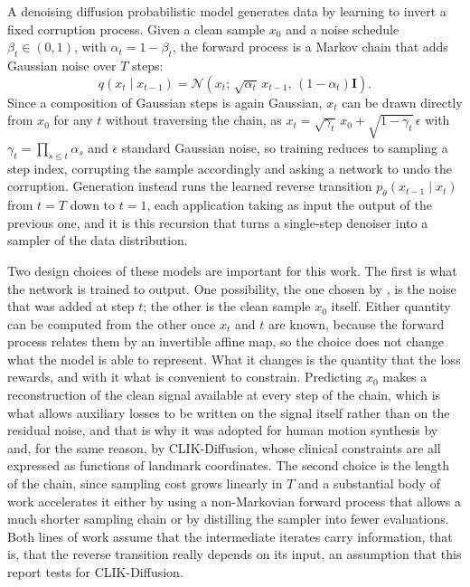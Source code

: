 \documentclass[10pt,a4paper]{article}
\begin{document}
A denoising diffusion probabilistic model \citep{sohldickstein2015,ho2020ddpm} generates data by learning to invert a fixed corruption process. Given a clean sample $x_0$ and a noise schedule $\beta_t \in (0,1)$, with $\alpha_t = 1-\beta_t$, the forward process is a Markov chain that adds Gaussian noise over $T$ steps:
\begin{equation}
q(x_t \mid x_{t-1}) = \mathcal{N}\!\left(x_t;\, \sqrt{\alpha_t}\, x_{t-1},\, (1-\alpha_t)\mathbf{I}\right).
\end{equation}
Since a composition of Gaussian steps is again Gaussian, $x_t$ can be drawn directly from $x_0$ for any $t$ without traversing the chain, as $x_t = \sqrt{\gamma_t}\,x_0 + \sqrt{1-\gamma_t}\,\epsilon$ with $\gamma_t = \prod_{s \le t} \alpha_s$ and $\epsilon$ standard Gaussian noise, so training reduces to sampling a step index, corrupting the sample accordingly and asking a network to undo the corruption. Generation instead runs the learned reverse transition $p_\theta(x_{t-1} \mid x_t)$ from $t = T$ down to $t = 1$, each application taking as input the output of the previous one, and it is this recursion that turns a single-step denoiser into a sampler of the data distribution.

Two design choices of these models are important for this work. The first is what the network is trained to output. One possibility, the one chosen by \citeauthor{ho2020ddpm}, is the noise that was added at step $t$; the other is the clean sample $x_0$ itself. Either quantity can be computed from the other once $x_t$ and $t$ are known, because the forward process relates them by an invertible affine map, so the choice does not change what the model is able to represent. What it changes is the quantity that the loss rewards, and with it what is convenient to constrain. Predicting $x_0$ makes a reconstruction of the clean signal available at every step of the chain, which is what allows auxiliary losses to be written on the signal itself rather than on the residual noise, and that is why it was adopted for human motion synthesis by \citet{tevet2023mdm} and, for the same reason, by CLIK-Diffusion, whose clinical constraints are all expressed as functions of landmark coordinates. The second choice is the length of the chain, since sampling cost grows linearly in $T$ and a substantial body of work accelerates it either by using a non-Markovian forward process that allows a much shorter sampling chain \citep{song2021ddim} or by distilling the sampler into fewer evaluations. Both lines of work assume that the intermediate iterates carry information, that is, that the reverse transition really depends on its input, an assumption that this report tests for CLIK-Diffusion.
\end{document}
